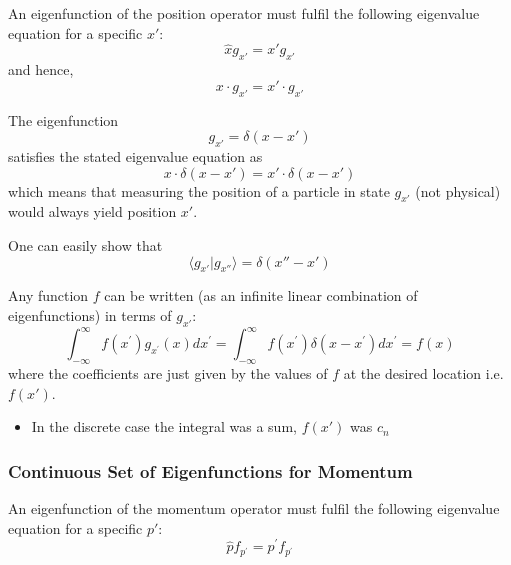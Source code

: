 An eigenfunction of the position operator must fulfil the following eigenvalue equation for a specific $x'$:
\begin{equation*}
    \hat{x}g_{x'} =x'g_{x'}
\end{equation*}
and hence,
\begin{equation*}
    x \cdot g_{x'} =x' \cdot g_{x'}
\end{equation*}


The eigenfunction
\begin{equation*}
    g_{x'}=\delta(x-x')
\end{equation*}
satisfies the stated eigenvalue equation as
\begin{equation*}
    x\cdot \delta(x-x')=x'\cdot \delta(x-x')
\end{equation*}
which means that measuring the position of a particle in state $g_{x'}$ (not physical) would always yield position $x'$.


One can easily show that
\begin{equation*}
    \langle g_{x'}|g_{x''}\rangle=\delta(x''-x')
\end{equation*}


Any function $f$ can be written (as an infinite linear combination of eigenfunctions) in terms of $g_{x'}$:
\begin{equation*}
    \int_{-\infty}^{\infty}f(x^{\prime})g_{x^{\prime}}(x)dx^{\prime}=\int_{-\infty}^{\infty}f(x^{\prime})\delta(x-x^{\prime})dx^{\prime}=f(x)
\end{equation*}
where the coefficients are just given by the values of $f$ at the desired location i.e. $f(x')$.


\begin{itemize}
    \item In the discrete case the integral was a sum, $f(x')$ was $c_n$
\end{itemize}

\subsubsection{Continuous Set of Eigenfunctions for Momentum}


An eigenfunction of the momentum operator must fulfil the following eigenvalue equation for a specific $p'$:
\begin{equation*}
    \hat{p}f_{p^{\prime}}=p^{\prime}f_{p^{\prime}}
\end{equation*}

